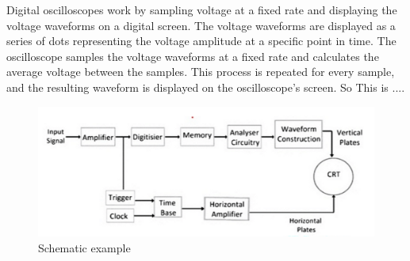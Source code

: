 Digital oscilloscopes work by sampling voltage at a fixed rate and displaying the voltage waveforms on a digital screen. The voltage waveforms are displayed as a series of dots representing the voltage amplitude at a specific point in time. The oscilloscope samples the voltage waveforms at a fixed rate and calculates the average voltage between the samples. This process is repeated for every sample, and the resulting waveform is displayed on the oscilloscope’s screen. So This is ....

\begin{figure}[H]
	\centering
	\includegraphics[width=12cm]{images/img_1.png}
	\caption{Schematic example}
	\label{fig:dunno-vol-2}
\end{figure}


















